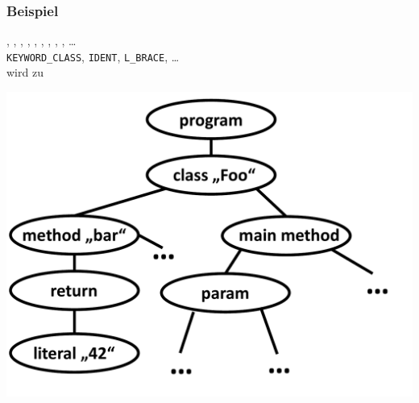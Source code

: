 \begin{frame}
	\frametitle{Beispiel}
	, , \token{\{}, , , , \token{(}, \token{)}, \token{\{}, \ldots \\
            \texttt{KEYWORD\_CLASS}, \texttt{IDENT}, \texttt{L\_BRACE}, \ldots \\
     wird zu \\
     \begin{center}
     \includegraphics[scale=0.3]{images/AST.pdf}
     \end{center}
\end{frame}